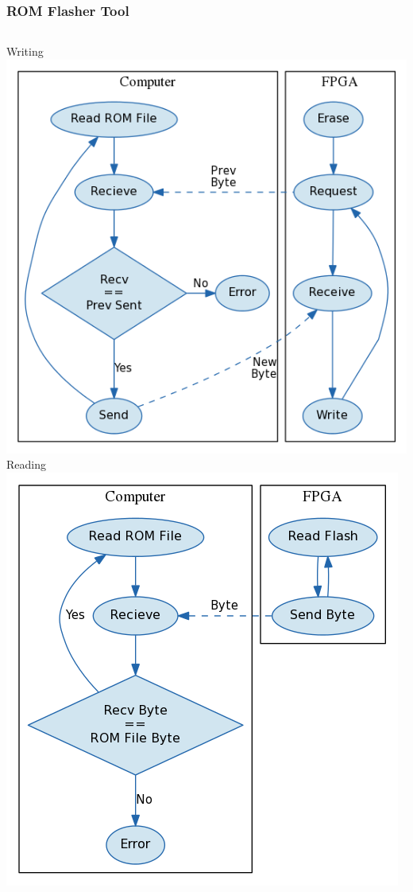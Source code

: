 \documentclass{beamer}
\begin{document}
\begin{frame}
    \frametitle{ROM Flasher Tool}
    \vspace{0.5cm}
    \begin{columns}[c]
            \centering Writing
            \includegraphics[height=0.65\textheight]{../../fpga/rom_flasher/doc/block_diagram_write.png}
            \centering Reading
            \includegraphics[height=0.65\textheight]{../../fpga/rom_flasher/doc/block_diagram_read.png}
    \end{columns}
\end{frame}
\end{document}

